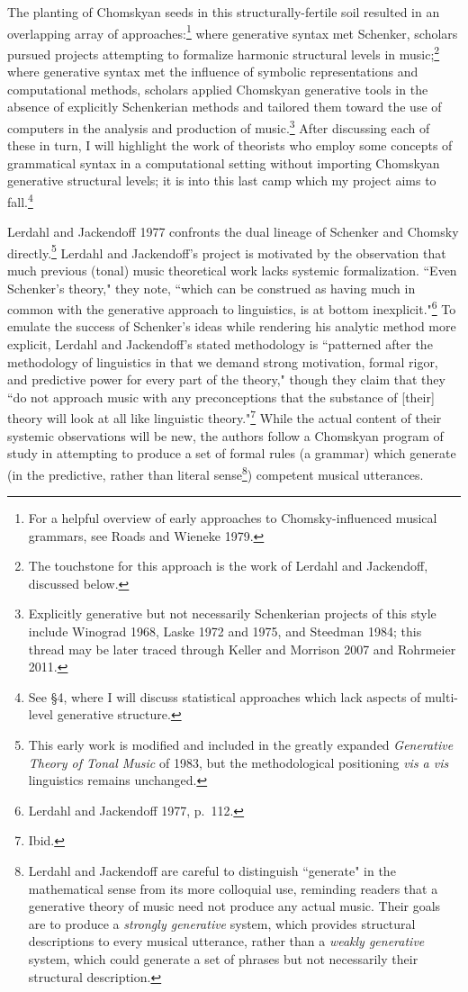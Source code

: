 The planting of Chomskyan seeds in this structurally-fertile soil resulted in an overlapping array of approaches:\footnote{For a helpful overview of early approaches to Chomsky-influenced musical grammars, see Roads and Wieneke 1979.}  where generative syntax met Schenker, scholars pursued projects attempting to formalize harmonic structural levels in music;\footnote{The touchstone for this approach is the work of Lerdahl and Jackendoff, discussed below.} where generative syntax met the influence of symbolic representations and computational methods, scholars applied Chomskyan generative tools in the absence of explicitly Schenkerian methods and tailored them toward the use of computers in the analysis and production of music.\footnote{Explicitly generative but not necessarily Schenkerian projects of this style include Winograd 1968, Laske 1972 and 1975, and Steedman 1984; this thread may be later traced through Keller and Morrison 2007 and Rohrmeier 2011.}  After discussing each of these in turn, I will highlight the work of theorists who employ some concepts of grammatical syntax in a computational setting without importing Chomskyan generative structural levels; it is into this last camp which my project aims to fall.\footnote{See \S 4, where I will discuss statistical approaches which lack aspects of multi-level generative structure.}

Lerdahl and Jackendoff 1977 confronts the dual lineage of Schenker and Chomsky directly.\footnote{This early work is modified and included in the greatly expanded \emph{Generative Theory of Tonal Music} of 1983, but the methodological positioning \emph{vis a vis} linguistics remains unchanged.}  Lerdahl and Jackendoff's project is motivated by the observation that much previous (tonal) music theoretical work lacks systemic formalization.  ``Even Schenker's theory," they note, ``which can be construed as having much in common with the generative approach to linguistics, is at bottom inexplicit."\footnote{Lerdahl and Jackendoff 1977, p.\ 112.}  To emulate the success of Schenker's ideas while rendering his analytic method more explicit, Lerdahl and Jackendoff's stated methodology is ``patterned after the methodology of linguistics in that we demand strong motivation, formal rigor, and predictive power for every part of the theory," though they claim that they ``do not approach music with any preconceptions that the substance of [their] theory will look at all like linguistic theory."\footnote{Ibid.}  While the actual content of their systemic observations will be new, the authors follow a Chomskyan program of study in attempting to produce a set of formal rules (a grammar) which generate (in the predictive, rather than literal sense\footnote{Lerdahl and Jackendoff are careful to distinguish ``generate" in the mathematical sense from its more colloquial use, reminding readers that a generative theory of music need not produce any actual music.  Their goals are to produce a \emph{strongly generative} system, which provides structural descriptions to every musical utterance, rather than a \emph{weakly generative} system, which could generate a set of phrases but not necessarily their structural description.}) competent musical utterances.

